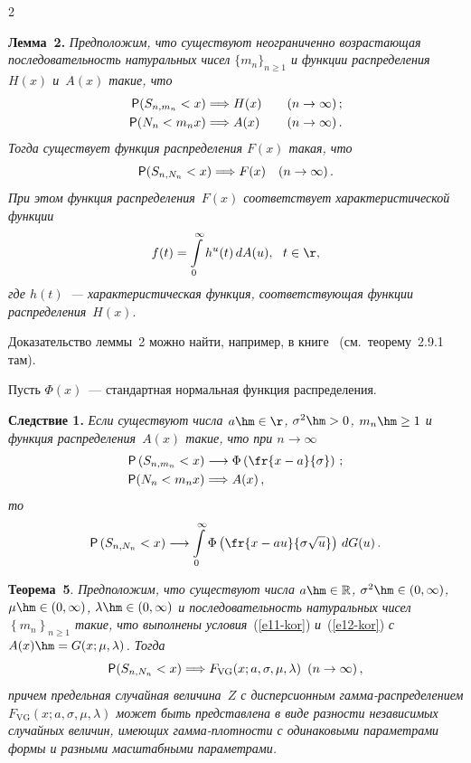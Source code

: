 \begin{multicols}{2}
\smallskip

\noindent
\textbf{Лемма~2.} \textit{Предположим, что существуют неограниченно
возрастающая последовательность натуральных чисел
$\{m_n\}_{n\ge1}$ и функции распределения~$H(x)$ и~$A(x)$ такие,
что}
\begin{align*}
{\sf P}(S_{n,m_n}<x)&\Longrightarrow H(x)\quad &  (n&\to\infty)\,;
\\
{\sf P}(N_n<m_nx)&\Longrightarrow A(x)\quad  &(n&\to\infty)\,.
\end{align*}
\textit{Тогда существует функция распределения $F(x)$ такая, что}
$$
{\sf P}(S_{n,N_n}<x)\Longrightarrow F(x)\quad  (n\to\infty)\,.
$$
\textit{При этом функция распределения~$F(x)$ соответствует
характеристической функции}
$$
f(t)=\int\limits_{0}^{\infty}h^u(t)\,dA(u),\ \ t\in\r,
$$
\textit{где $h(t)$~--- характеристическая функция, соответствующая функции
рас\-пре\-де\-ле\-ния}~$H(x)$.

\smallskip

Доказательство леммы~2 можно найти, например, в книге~\cite{KorolevBeningShorgin2011} 
(см.\ теорему~2.9.1 там).

Пусть $\Phi(x)$~--- стандартная нормальная функция распределения.

\smallskip

\noindent
\textbf{Следствие 1.} \textit{Если существуют числа $a\hm\in\r$,
$\sigma^2\hm>0$, $m_n\hm\ge1$ и функция распределения~$A(x)$ такие, что
при $n\to\infty$}
\begin{align}
{\sf P}\left(S_{n,m_n}<x\right)&\longrightarrow
\Phi\left(\fr{x-a}{\sigma}\right)\,;\label{e11-kor}
\\
{\sf P}(N_n<m_nx)&\Longrightarrow A(x)\,,\label{e12-kor}
\end{align}
\textit{то}
$$
{\sf
P}\left(S_{n,N_n}<x\right)\longrightarrow\int\limits_{0}^{\infty}\Phi
\left(\fr{x-au}{\sigma\sqrt{u}}\right)\,dG(u)\,.
$$


\smallskip

\noindent
\textbf{Теорема~5}. \textit{Предположим, что существуют числа $a \hm \in
\mathbb{R}$, $\sigma^{2}\hm \in (0, \infty )$, $\mu\hm\in(0,\infty)$,
$\lambda \hm\in (0, \infty )$ и последовательность натуральных чисел
$\left\{m_n \right\}_{n \geqslant 1}$ такие, что выполнены условия}~(\ref{e11-kor}) 
\textit{и}~(\ref{e12-kor}) \textit{с $A(x)\hm=G(x;\mu,\lambda)$. Тогда}
\begin{equation}
{\sf P}(S_{n, N_{n}}<x)\Longrightarrow
F_{\mathrm{VG}}(x;a,\sigma,\mu,\lambda) \enskip (n\rightarrow \infty)\,,\label{e13-kor}
\end{equation}
\textit{причем предельная случайная величина~$Z$ с дисперсионным
гам\-ма-рас\-пре\-де\-ле\-ни\-ем $F_{\mathrm{VG}}(x;a,\sigma,\mu,\lambda)$ может быть
представлена в виде разности независимых случайных величин, имеющих
гам\-ма-плот\-ности с одинаковыми параметрами формы и разными
масштабными параметрами.}


\end{multicols}
